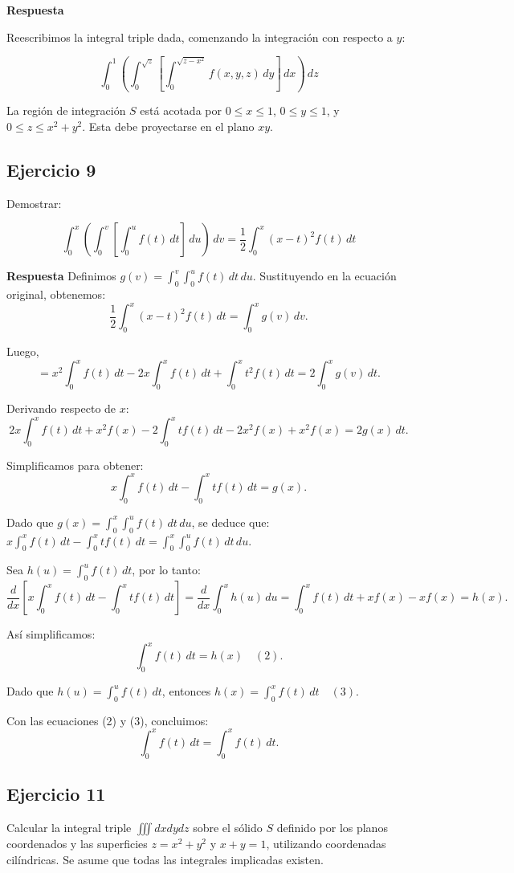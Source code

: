 \documentclass{report}
\begin{document}
\textbf{Respuesta}

Reescribimos la integral triple dada, comenzando la integración con respecto a $ y $:

\[
\int_{0}^{1} \left( \int_{0}^{\sqrt{z}} \left[ \int_{0}^{\sqrt{z - x^2}} f(x, y, z) \, d y \right] \, d x \right) \, d z
\] 

La región de integración $ S $ está acotada por $ 0 \leq x \leq 1 $, $ 0 \leq y \leq 1 $, y $ 0 \leq z \leq x^2 + y^2 $. Esta debe proyectarse en el plano $ xy $.\subsection{Ejercicio 9}
Demostrar: 

$$
\int_{0}^{x}\left(\int_{0}^{v}\left[\int_{0}^{u} f(t) \, dt \right] \, du \right) \, dv = \frac{1}{2} \int_{0}^{x}(x-t)^{2} f(t) \, dt
$$

\textbf{Respuesta} Definimos \( g(v) = \int_{0}^{v} \int_{0}^{u} f(t) \, dt \, du \). Sustituyendo en la ecuación original, obtenemos:
\[
\frac{1}{2} \int_{0}^{x} (x-t)^{2} f(t) \, dt = \int_{0}^{x} g(v) \, dv.
\]

Luego,
\[
= x^{2} \int_{0}^{x} f(t) \, dt - 2 x \int_{0}^{x} f(t) \, dt + \int_{0}^{x} t^{2} f(t) \, dt = 2 \int_{0}^{x} g(v) \, dt.
\]

Derivando respecto de \( x \):
\[
2 x \int_{0}^{x} f(t) \, dt + x^{2} f(x) - 2 \int_{0}^{x} t f(t) \, dt - 2 x^{2} f(x) + x^{2} f(x) = 2 g(x) \, dt.
\]

Simplificamos para obtener:
\[
x \int_{0}^{x} f(t) \, dt - \int_{0}^{x} t f(t) \, dt = g(x).
\]

Dado que \( g(x) = \int_{0}^{x} \int_{0}^{u} f(t) \, dt \, du \), se deduce que:
\( x \int_{0}^{x} f(t) \, dt - \int_{0}^{x} t f(t) \, dt = \int_{0}^{x} \int_{0}^{u} f(t) \, dt \, du \).

Sea \( h(u) = \int_{0}^{u} f(t) \, dt \), por lo tanto:
\[
\frac{d}{dx}\left[x \int_{0}^{x} f(t) \, dt - \int_{0}^{x} t f(t) \, dt \right] = \frac{d}{dx} \int_{0}^{x} h(u) \, du = \int_{0}^{x} f(t) \, dt + x f(x) - x f(x) = h(x).
\]

Así simplificamos:
\[
\int_{0}^{x} f(t) \, dt = h(x) \quad (2).
\]

Dado que \( h(u) = \int_{0}^{u} f(t) \, dt \), entonces \( h(x) = \int_{0}^{x} f(t) \, dt \quad (3) \).

Con las ecuaciones (2) y (3), concluimos:
\[
\int_{0}^{x} f(t) \, dt = \int_{0}^{x} f(t) \, dt.
\]\subsection{Ejercicio 11}
Calcular la integral triple $\iiint d x d y d z$ sobre el sólido $S$ definido por los planos coordenados y las superficies $z = x^2 + y^2$ y $x + y = 1$, utilizando coordenadas cilíndricas. Se asume que todas las integrales implicadas existen.
\end{document}
